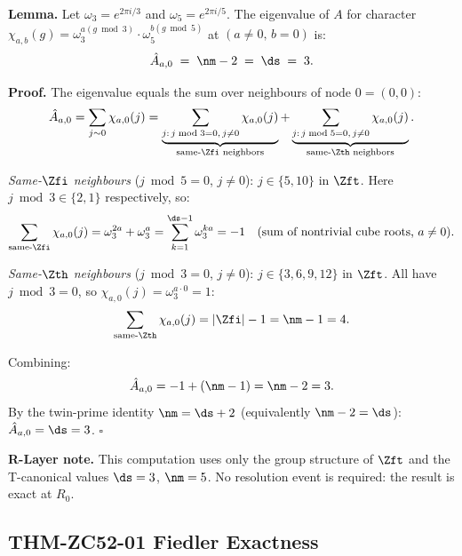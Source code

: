 \documentclass[12pt, a4paper]{article}
\begin{document}
\begin{formalbox}[title={LEM-ZC52-01: Character Eigenvalue for
  $(a\neq 0,\,b=0)$ is $n_m-2 = d_s$ (Exact, $R_0$)}]
\textbf{Lemma.}
Let $\omega_3 = e^{2\pi i/3}$ and $\omega_5 = e^{2\pi i/5}$.
The eigenvalue of $A$ for character
$\chi_{a,b}(g) = \omega_3^{a(g\bmod 3)}\cdot\omega_5^{b(g\bmod 5)}$
at $(a\neq 0,\, b=0)$ is:
\begin{equation}\label{zc52:eq:char-eig}
  \hat{A}_{a,0} \;=\; \nm - 2 \;=\; \ds \;=\; 3.
\end{equation}

\textbf{Proof.}
The eigenvalue equals the sum over neighbours of node $0 = (0,0)$:
\[
  \hat{A}_{a,0}
  = \sum_{\substack{j\sim 0}} \chi_{a,0}(j)
  = \underbrace{\sum_{\substack{j:\,j\bmod 3=0,\,j\neq 0}}
      \chi_{a,0}(j)}_{\text{same-}\Zfi\text{ neighbors}}
  +
  \underbrace{\sum_{\substack{j:\,j\bmod 5=0,\,j\neq 0}}
      \chi_{a,0}(j)}_{\text{same-}\Zth\text{ neighbors}}.
\]

\emph{Same-$\Zfi$ neighbours} ($j\bmod 5 = 0$, $j\neq 0$):
$j\in\{5, 10\}$ in $\Zft$.
Here $j\bmod 3 \in\{2, 1\}$ respectively, so:
\[
  \sum_{\text{same-}\Zfi} \chi_{a,0}(j)
  = \omega_3^{2a} + \omega_3^{a}
  = \sum_{k=1}^{\ds-1}\omega_3^{ka}
  = -1 \quad (\text{sum of nontrivial cube roots, } a\neq 0).
\]

\emph{Same-$\Zth$ neighbours} ($j\bmod 3 = 0$, $j\neq 0$):
$j\in\{3, 6, 9, 12\}$ in $\Zft$.
All have $j\bmod 3 = 0$, so $\chi_{a,0}(j) = \omega_3^{a\cdot 0}=1$:
\[
  \sum_{\text{same-}\Zth} \chi_{a,0}(j) = |\Zfi|-1 = \nm-1 = 4.
\]

Combining:
\[
  \hat{A}_{a,0} = -1 + (\nm-1) = \nm - 2 = 3.
\]
By the twin-prime identity $\nm = \ds + 2$ (equivalently $\nm-2=\ds$):
$\hat{A}_{a,0} = \ds = 3$. \hfill$\square$

\textbf{R-Layer note.} This computation uses only the group
structure of $\Zft$ and the T-canonical values $\ds=3$, $\nm=5$.
No resolution event is required: the result is exact at $R_0$.
\end{formalbox}

\subsection{THM-ZC52-01 \quad Fiedler Exactness}

\end{document}
